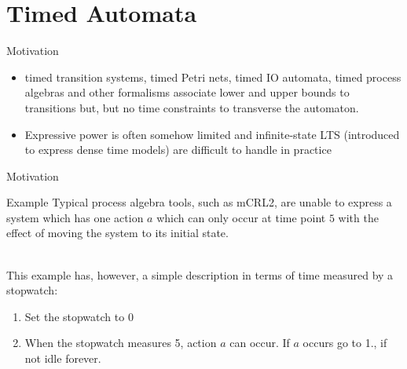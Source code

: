 \documentclass{beamer}
\def\dgold#1{{\darkgoldenrod #1}}
\def\dkb#1{{\blue #1}}
\begin{document}

\section{Timed Automata}
\begin{slide}{Motivation}
\small

\begin{itemize}
\item \dgold{timed transition systems}, \dgold{timed Petri nets}, \dgold{timed IO automata}, \dgold{timed process algebras} and other formalisms associate lower and upper bounds to transitions but, but no \dkb{time constraints} to transverse the automaton.
\item Expressive power is often somehow limited and \dgold{infinite}-state LTS (introduced to express \dkb{dense} time models) are 
difficult to handle in practice
\end{itemize}
\end{slide}


\begin{slide}{Motivation}
\small

\begin{block}{Example}
Typical process algebra tools, such as mCRL2, are unable to express a \dgold{system which has one action $a$ which can only occur at time point $5$
with the effect of moving the system to its initial state.}
\end{block}
~\\

This example has, however, a simple description in terms of time measured by a \dgold{stopwatch}:
\begin{enumerate}
\item Set the stopwatch to 0
\item When the stopwatch measures 5, action $a$ can occur. If $a$ occurs go to 1., if not idle forever.
\end{enumerate}

~\\
\end{slide}
\end{document}
